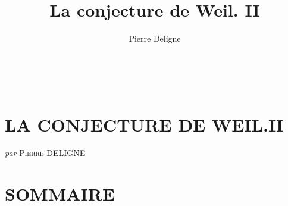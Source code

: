 \documentclass[11pt,leqno]{article}
\title{La conjecture de Weil. II}
\author{Pierre Deligne}
\date{}
\newcommand{\Page}[1]{\ifvmode\noindent\else\unskip\ \fi{\footnotesize\textcolor{gray}{[p.\,#1]}}\ \ignorespaces}
\begin{document}
\maketitle
\Page{137}
\section*{\centering\normalfont LA CONJECTURE DE WEIL.II}

\begin{center}
\textit{par} \textsc{Pierre} DELIGNE
\end{center}

\section*{\centering\normalfont\normalsize SOMMAIRE}
\end{document}
